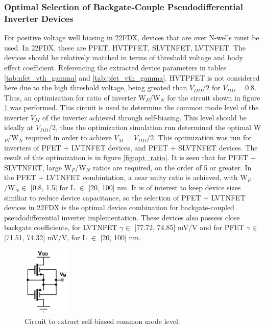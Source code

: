 		\FloatBarrier\subsubsection{Optimal Selection of Backgate-Couple Pseudodifferential Inverter Devices}
		For positive voltage well biasing in 22FDX, devices that are over N-wells must be used. In 22FDX, these are PFET, HVTPFET, SLVTNFET, LVTNFET. The devices should be relatively matched in terms of threshold voltage and body effect coefficient. Referencing the extracted device parameters in tables \ref{tab:nfet_vth_gamma} and \ref{tab:pfet_vth_gamma}. HVTPFET is not considered here due to the high threshold voltage, being greated than $V_{DD}/2$ for $V_{DD}=0.8$. Thus, an optimization for ratio of inverter W$_P$/W$_N$ for the circuit shown in figure \ref{fig:inv_vm} was performed. This circuit is used to determine the common mode level of the inverter $V_{M}$ of the inverter achieved through self-biasing. This level should be ideally at $V_{DD}/2$, thus the optimization simulation run determined the optimal W$_P$/W$_N$ required in order to achieve $V_{M}$ = $V_{DD}/2$. This optimization was run for inverters of PFET + LVTNFET devices, and PFET + SLVTNFET devices. The result of this optimization is in figure \ref{fig:opt_ratio}. It is seen that for PFET + SLVTNFET, large W$_P$/W$_N$ ratios are required, on the order of 5 or greater. In the PFET + LVTNFET combintation, a near unity ratio is achieved, with W$_P$/W$_N \in$ [0.8, 1.5] for L $\in$ [20, 100] nm. It is of interest to keep device sizes similiar to reduce device capacitance, so the selection of PFET + LVTNFET devices in 22FDX is the optimal device combination for backgate-coupled pseudodifferential inverter implementation. These devices also possess close backgate coefficients, for LVTNFET $\gamma \in$ [77.72, 74.85] mV/V and for PFET $\gamma \in$ [71.51, 74.32] mV/V, for L $\in$ [20, 100] nm. 

			\begin{figure}[htb!]
			        \centering
			        \includegraphics[width=0.2\textwidth, angle=0]{./figs/design/inv_vm}
			    \caption{Circuit to extract self-biased common mode level.}
			    \label{fig:inv_vm}
			\end{figure}

